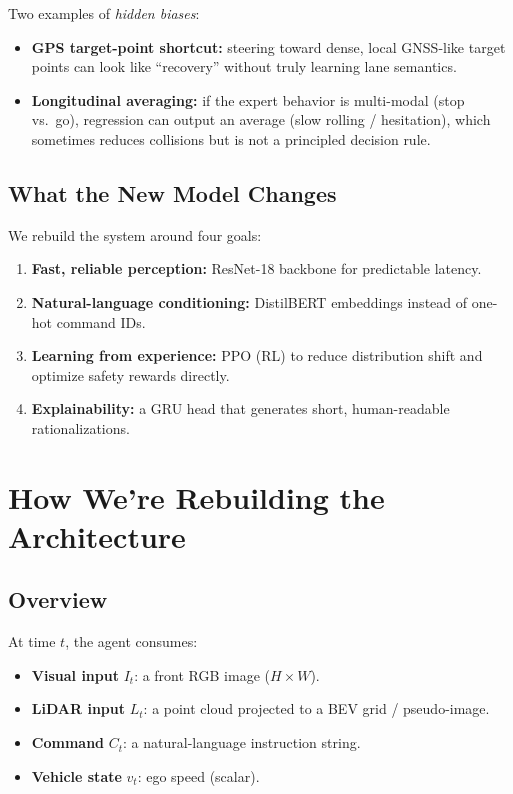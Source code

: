 \documentclass[11pt]{article}
\begin{document}
Two examples of \emph{hidden biases}:
\begin{itemize}[leftmargin=1.2em]
  \item \textbf{GPS target-point shortcut:} steering toward dense, local GNSS-like target points can look like ``recovery'' without truly learning lane semantics.
  \item \textbf{Longitudinal averaging:} if the expert behavior is multi-modal (stop vs.\ go), regression can output an average (slow rolling / hesitation), which sometimes reduces collisions but is not a principled decision rule.
\end{itemize}

\subsection{What the New Model Changes}
We rebuild the system around four goals:
\begin{enumerate}[leftmargin=1.2em]
  \item \textbf{Fast, reliable perception:} ResNet-18 backbone for predictable latency.
  \item \textbf{Natural-language conditioning:} DistilBERT embeddings instead of one-hot command IDs.
  \item \textbf{Learning from experience:} PPO (RL) to reduce distribution shift and optimize safety rewards directly.
  \item \textbf{Explainability:} a GRU head that generates short, human-readable rationalizations.
\end{enumerate}

\section{How We're Rebuilding the Architecture}

\subsection{Overview}
At time $t$, the agent consumes:
\begin{itemize}[leftmargin=1.2em]
  \item \textbf{Visual input} $I_t$: a front RGB image ($H\times W$).
  \item \textbf{LiDAR input} $L_t$: a point cloud projected to a BEV grid / pseudo-image.
  \item \textbf{Command} $C_t$: a natural-language instruction string.
  \item \textbf{Vehicle state} $v_t$: ego speed (scalar).
\end{itemize}
\end{document}
